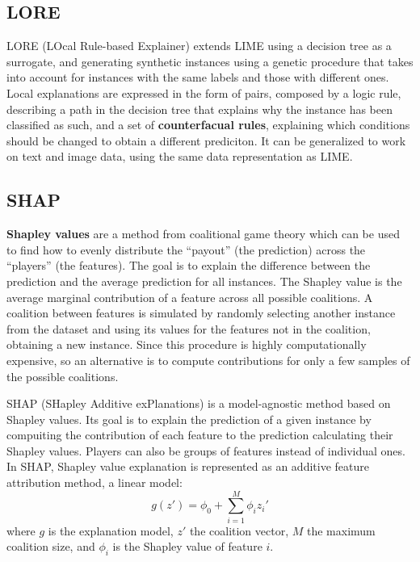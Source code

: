 \subsection{LORE}

LORE (LOcal Rule-based Explainer) extends LIME using a decision tree as a surrogate, and generating synthetic instances using a genetic procedure that takes into account for instances with the same labels and those with different ones. Local explanations are expressed in the form of pairs, composed by a logic rule, describing a path in the decision tree that explains why the instance has been classified as such, and a set of \textbf{counterfacual rules}, explaining which conditions should be changed to obtain a different prediciton. It can be generalized to work on text and image data, using the same data representation as LIME.

\subsection{SHAP}

\textbf{Shapley values} are a method from coalitional game theory which can be used to find how to evenly distribute the ``payout'' (the prediction) across the ``players'' (the features). The goal is to explain the difference between the prediction and the average prediction for all instances. The Shapley value is the average marginal contribution of a feature across all possible coalitions. A coalition between features is simulated by randomly selecting another instance from the dataset and using its values for the features not in the coalition, obtaining a new instance. Since this procedure is highly computationally expensive, so an alternative is to compute contributions for only a few samples of the possible coalitions.

SHAP (SHapley Additive exPlanations) is a model-agnostic method based on Shapley values. Its goal is to explain the prediction of a given instance by compuiting the contribution of each feature to the prediction calculating their Shapley values. Players can also be groups of features instead of individual ones. In SHAP, Shapley value explanation is represented as an additive feature attribution method, a linear model:
\begin{equation*}
    g(z') = \phi_0 + \sum_{i=1}^M \phi_i z_i'
\end{equation*}
where $g$ is the explanation model, $z'$ the coalition vector, $M$ the maximum coalition size, and $\phi_i$ is the Shapley value of feature $i$.

